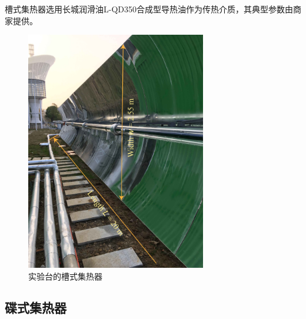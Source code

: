 槽式集热器选用长城润滑油L-QD350合成型导热油作为传热介质，其典型参数由商家提供。

\begin{figure}[!ht]
\centering
\includegraphics[width=0.7\textwidth]{fig/TroughCollector.jpg}
\caption{实验台的槽式集热器}
\label{fig:TroughCollector}
\end{figure}

\subsection{碟式集热器}

